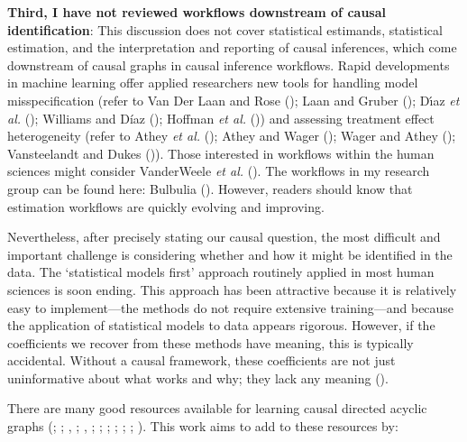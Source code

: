 \documentclass[
  single column]{article}
\begin{document}
\textbf{Third, I have not reviewed workflows downstream of causal
identification}: This discussion does not cover statistical estimands,
statistical estimation, and the interpretation and reporting of causal
inferences, which come downstream of causal graphs in causal inference
workflows. Rapid developments in machine learning offer applied
researchers new tools for handling model misspecification (refer to Van
Der Laan and Rose (); Laan and Gruber
(); Dı́az \emph{et al.}
(); Williams and Díaz
(); Hoffman \emph{et al.}
()) and assessing treatment effect
heterogeneity (refer to Athey \emph{et al.}
(); Athey and Wager
(); Wager and Athey
(); Vansteelandt and Dukes
()). Those interested in workflows
within the human sciences might consider VanderWeele \emph{et al.}
(). The workflows in my research
group can be found here: Bulbulia
(). However, readers should
know that estimation workflows are quickly evolving and improving.

Nevertheless, after precisely stating our causal question, the most
difficult and important challenge is considering whether and how it
might be identified in the data. The `statistical models first' approach
routinely applied in most human sciences is soon ending. This approach
has been attractive because it is relatively easy to implement---the
methods do not require extensive training---and because the application
of statistical models to data appears rigorous. However, if the
coefficients we recover from these methods have meaning, this is
typically accidental. Without a causal framework, these coefficients are
not just uninformative about what works and why; they lack any meaning
().

There are many good resources available for learning causal directed
acyclic graphs (;
;
,
; , ;
;
;
;
; ; ). This work
aims to add to these resources by:
\end{document}
